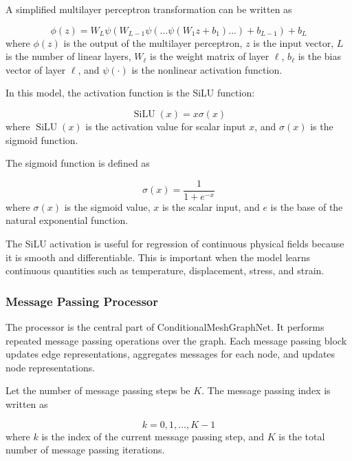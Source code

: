 A simplified multilayer perceptron transformation can be written as

\begin{equation}
\phi(z)
=
W_L
\psi
\left(
W_{L-1}
\psi
\left(
\dots
\psi
\left(
W_1 z
+
b_1
\right)
\dots
\right)
+
b_{L-1}
\right)
+
b_L
\end{equation}
where \(\phi(z)\) is the output of the multilayer perceptron, \(z\) is the input vector, \(L\) is the number of linear layers, \(W_{\ell}\) is the weight matrix of layer \(\ell\), \(b_{\ell}\) is the bias vector of layer \(\ell\), and \(\psi(\cdot)\) is the nonlinear activation function.

In this model, the activation function is the SiLU function:

\begin{equation}
\operatorname{SiLU}(x)
=
x\sigma(x)
\end{equation}
where \(\operatorname{SiLU}(x)\) is the activation value for scalar input \(x\), and \(\sigma(x)\) is the sigmoid function.

The sigmoid function is defined as

\begin{equation}
\sigma(x)
=
\frac{1}{1+e^{-x}}
\end{equation}
where \(\sigma(x)\) is the sigmoid value, \(x\) is the scalar input, and \(e\) is the base of the natural exponential function.

The SiLU activation is useful for regression of continuous physical fields because it is smooth and differentiable. This is important when the model learns continuous quantities such as temperature, displacement, stress, and strain.

\subsubsection{Message Passing Processor}

The processor is the central part of ConditionalMeshGraphNet. It performs repeated message passing operations over the graph. Each message passing block updates edge representations, aggregates messages for each node, and updates node representations.

Let the number of message passing steps be \(K\). The message passing index is written as

\begin{equation}
k = 0,1,\dots,K-1
\end{equation}
where \(k\) is the index of the current message passing step, and \(K\) is the total number of message passing iterations.

